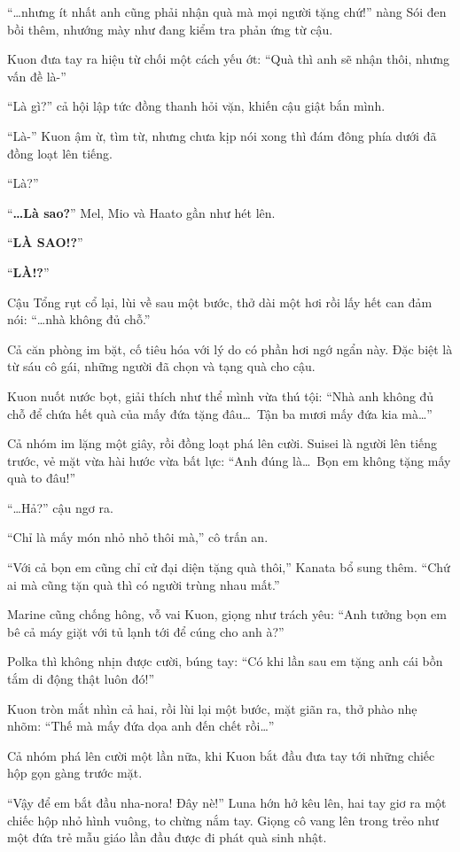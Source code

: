 \documentclass[../main.tex]{subfiles}
\begin{document}
``\dots nhưng ít nhất anh cũng phải nhận quà mà mọi người tặng chứ!'' nàng Sói đen bồi thêm, nhướng mày như đang kiểm tra phản ứng từ cậu.

Kuon đưa tay ra hiệu từ chối một cách yếu ớt: ``Quà thì anh sẽ nhận thôi, nhưng vấn đề là-''

``Là gì?'' cả hội lập tức đồng thanh hỏi vặn, khiến cậu giật bắn mình.

``Là-'' Kuon ậm ừ, tìm từ, nhưng chưa kịp nói xong thì đám đông phía dưới đã đồng loạt lên tiếng.

``Là?''

``\textbf{\dots Là sao?}'' Mel, Mio và Haato gần như hét lên.

``\textbf{LÀ SAO!?}''

``\textbf{LÀ!?}''

Cậu Tổng rụt cổ lại, lùi về sau một bước, thở dài một hơi rồi lấy hết can đảm nói: ``\dots nhà không đủ chỗ.''

Cả căn phòng im bặt, cố tiêu hóa với lý do có phần hơi ngớ ngẩn này. Đặc biệt là từ sáu cô gái, những người đã chọn và tạng quà cho cậu.

Kuon nuốt nước bọt, giải thích như thể mình vừa thú tội: ``Nhà anh không đủ chỗ để chứa hết quà của mấy đứa tặng đâu\dots\ Tận ba mươi mấy đứa kia mà\dots''

Cả nhóm im lặng một giây, rồi đồng loạt phá lên cười. Suisei là người lên tiếng trước, vẻ mặt vừa hài hước vừa bất lực: ``Anh đúng là\dots\ Bọn em không tặng mấy quà to đâu!''

``\dots Hả?'' cậu ngơ ra.

``Chỉ là mấy món nhỏ nhỏ thôi mà,'' cô trấn an.

``Với cả bọn em cũng chỉ cử đại diện tặng quà thôi,'' Kanata bổ sung thêm. ``Chứ ai mà cũng tặn quà thì có người trùng nhau mất.''

Marine cũng chống hông, vỗ vai Kuon, giọng như trách yêu: ``Anh tưởng bọn em bê cả máy giặt với tủ lạnh tới để cúng cho anh à?''

Polka thì không nhịn được cười, búng tay: ``Có khi lần sau em tặng anh cái bồn tắm di động thật luôn đó!''

Kuon tròn mắt nhìn cả hai, rồi lùi lại một bước, mặt giãn ra, thở phào nhẹ nhõm: ``Thế mà mấy đứa dọa anh đến chết rồi\dots''

Cả nhóm phá lên cười một lần nữa, khi Kuon bắt đầu đưa tay tới những chiếc hộp gọn gàng trước mặt.

``Vậy để em bắt đầu nha-nora! Đây nè!'' Luna hớn hở kêu lên, hai tay giơ ra một chiếc hộp nhỏ hình vuông, to chừng nắm tay. Giọng cô vang lên trong trẻo như một đứa trẻ mẫu giáo lần đầu được đi phát quà sinh nhật.
\end{document}
